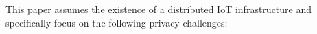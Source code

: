 This paper assumes the existence of a distributed IoT infrastructure
and specifically focus on the following privacy challenges:
%
%
%
